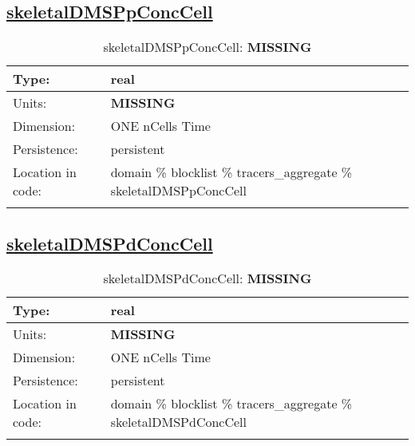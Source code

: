 \subsection[skeletalDMSPpConcCell]{\hyperref[sec:var_tab_tracers_aggregate]{skeletalDMSPpConcCell}}
\label{subsec:var_sec_tracers_aggregate_skeletalDMSPpConcCell}
\begin{center}
\begin{longtable}{| p{2.0in} | p{4.0in} |}
        \hline 
        Type: & real \\
        \hline 
        Units: & {\bf \color{red} MISSING} \\
        \hline 
        Dimension: & ONE nCells Time \\
        \hline 
        Persistence: & persistent \\
        \hline 
         Location in code: & domain \% blocklist \% tracers\_aggregate \% skeletalDMSPpConcCell \\
         \hline 
    \caption{skeletalDMSPpConcCell: {\bf \color{red} MISSING}}
\end{longtable}
\end{center}
\subsection[skeletalDMSPdConcCell]{\hyperref[sec:var_tab_tracers_aggregate]{skeletalDMSPdConcCell}}
\label{subsec:var_sec_tracers_aggregate_skeletalDMSPdConcCell}
\begin{center}
\begin{longtable}{| p{2.0in} | p{4.0in} |}
        \hline 
        Type: & real \\
        \hline 
        Units: & {\bf \color{red} MISSING} \\
        \hline 
        Dimension: & ONE nCells Time \\
        \hline 
        Persistence: & persistent \\
        \hline 
         Location in code: & domain \% blocklist \% tracers\_aggregate \% skeletalDMSPdConcCell \\
         \hline 
    \caption{skeletalDMSPdConcCell: {\bf \color{red} MISSING}}
\end{longtable}
\end{center}
